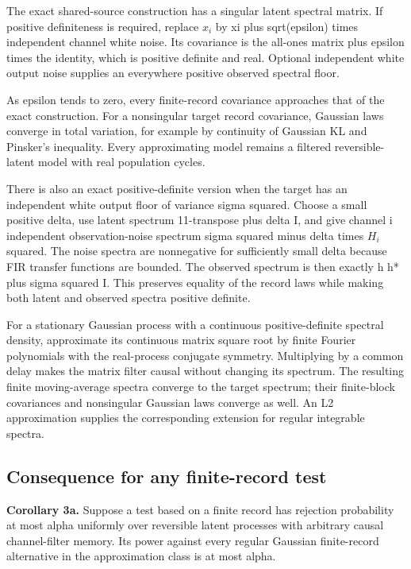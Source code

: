 \documentclass[11pt,a4paper]{article}
\begin{document}
The exact shared-source construction has a singular latent spectral matrix. If positive definiteness is required, replace $x_{i}$ by xi plus sqrt(epsilon) times independent channel white noise. Its covariance is the all-ones matrix plus epsilon times the identity, which is positive definite and real. Optional independent white output noise supplies an everywhere positive observed spectral floor.

As epsilon tends to zero, every finite-record covariance approaches that of the exact construction. For a nonsingular target record covariance, Gaussian laws converge in total variation, for example by continuity of Gaussian KL and Pinsker's inequality. Every approximating model remains a filtered reversible-latent model with real population cycles.

There is also an exact positive-definite version when the target has an independent white output floor of variance sigma squared. Choose a small positive delta, use latent spectrum 11-transpose plus delta I, and give channel i independent observation-noise spectrum sigma squared minus delta times \textbar $H_{i}$\textbar{} squared. The noise spectra are nonnegative for sufficiently small delta because FIR transfer functions are bounded. The observed spectrum is then exactly h h* plus sigma squared I. This preserves equality of the record laws while making both latent and observed spectra positive definite.

For a stationary Gaussian process with a continuous positive-definite spectral density, approximate its continuous matrix square root by finite Fourier polynomials with the real-process conjugate symmetry. Multiplying by a common delay makes the matrix filter causal without changing its spectrum. The resulting finite moving-average spectra converge to the target spectrum; their finite-block covariances and nonsingular Gaussian laws converge as well. An L2 approximation supplies the corresponding extension for regular integrable spectra.

\subsection{Consequence for any finite-record test}

\textbf{Corollary 3a.} Suppose a test based on a finite record has rejection probability at most alpha uniformly over reversible latent processes with arbitrary causal channel-filter memory. Its power against every regular Gaussian finite-record alternative in the approximation class is at most alpha.
\end{document}
